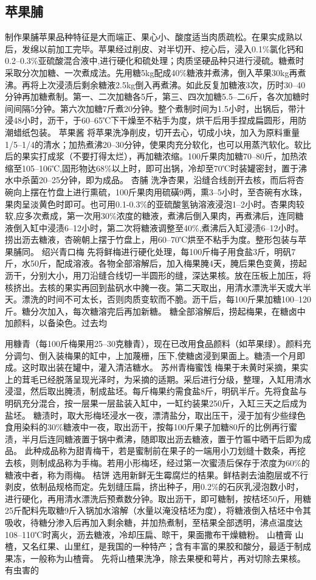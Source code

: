 \documentclass{ctexbook}
\begin{document}
\subsection{苹果脯}
制作果脯苹果品种特征是大而端正、果心小、酸度适当肉质疏松。在果实成熟以后，发绵以前加工完毕。苹果经过削皮、对半切开、挖心后，浸入0.1\%氯化钙和0.2--0.3\%亚硫酸混合液中,进行硬化和硫处理；肉质坚硬品种只进行浸硫。糖煮时采取分次加糖、一次煮成法。先用糖5kg配成40\%糖液并煮沸，倒入苹果30kg再煮沸。再将上次浸渍后剩余糖液2.5kg倒入再煮沸。如此反复加糖液3次，历时30--40分钟再加糖煮制。第一、二次加糖各5斤，第三、四次加糖5.5--二6斤，各次加糖时间间隔5分钟。第六次加糖7斤煮20分钟。整个煮制时间为1.5小时，出锅后，带汁浸48小时，沥干，于60--65℃下干燥至不粘手为度，烘干后用手捏成扁圆形，用防潮蜡纸包装。
苹果酱
将苹果洗净削皮，切开去心，切成小块，加入为原料重量1/5--1/4的清水；加热煮沸20--30分钟，使果肉充分软化，也可以用蒸汽软化。软比后的果实打成浆（不要打得太烂），再加糖浓缩。100斤果肉加糖70--80斤，加热浓缩至105--106℃,固形物达68\%以上时，即可出锅，冷却至70℃时装罐密封，置于沸水中杀菌20--25分钟，即为成品。
杏脯
洗净杏果，沿缝合线剖开去核，而后将杏碗向上摆在竹盘上进行熏硫，100斤果肉用硫磺9两，熏3--5小时，至杏碗有水珠，果肉呈淡黄色时即可。也可用0.1-0.3\%的亚硫酸氢钠溶液浸泡1--2小时。杏果肉较软,应多次煮成，第一次用30\%浓度的糖液，煮沸后倒入果肉，再煮沸后，连同糖液倒入缸中浸渍6--12小时，第二次将糖液调整至40\%,煮沸后入缸浸渍6--12小时。捞出沥去糖液，杏碗朝上摆于竹盘上，用60--70℃烘至不粘手为度。整形包装与苹果脯同。
绍兴青口梅
先将鲜梅进行硬化处理，每100斤梅子用食盐3斤，明矾7斤，水50斤，配成溶液。各物全部溶解后，加入梅果腌4天，腌后果色变黄，捞起沥干，分别大小，用刀沿缝合线切一半圆形的缝，深达果核。放在压板上加压，将核挤出。去核的果实再回到盐矾水中腌一夜。第二天取出，用清水漂洗半天或大半天。漂洗的时间不可太长，否则肉质变软而不脆。沥干后，每100斤果加糖100--120斤。糖分次加入，每次糖溶完后再加新糖。
糖全部溶解后，捞起梅果，在糖卤中加颜料，以备染色。过去均

用糠青（每100斤梅果用25--30克糠青），现在已改用食品颜料（如苹果绿）。颜料充分调匀、倒入装梅果的缸中，上加蔑栅，压下,使糖卤浸到果面上。糖渍一个月即成。这时取出装在罐中，灌入清洁糖水。
苏州青梅蜜饯
梅果于未黄时采摘，果实上的茸毛已经脱落呈现光泽时，为采摘的适期。采后进行分级，整理，入缸用清水浸湿，然后取出腌渍，制成盐坯。每斤梅果约需食盐8斤，明矾半斤。先将食盐与明矾充分混合，按一层果一层盐装入缸中，一缸约装果250斤，入缸三天之后成为盐坯。
糖渍时，取大形梅坯浸水一夜，漂清盐分，取出压干，浸于加有少些绿色食用染料的30\%糖液中一夜，取出沥干，按每100斤果子加糖80斤的比例再行蜜渍，半月后连同糖液置于锅中煮沸，随即取出沥去糖液，置于竹匾中晒干后即为成品。
此种成品称为甜青梅干，若是蜜制前在果子的一端用小刀划缝十数条，再挖去核，则制成品称为手梅。若用小形梅坯，经过第一次蜜渍后保存于浓度为60\%的糖液中者，称为雨梅。
桔饼
选用新鲜无生霉腐烂的桔果。鲜桔剥去油胞层或不行剥皮，依制品规格而定。先划缝压扁，挤出种子，用0.2\%的石灰乳浸泡数小时，进行硬化，再用清水漂洗后预煮数分钟。取出沥干，即可糖制，按桔坯50斤，用糖25斤配料先取糖9斤入锅加水溶解（水量以淹没桔坯为度），将糖液倒入桔坯中令其吸收，待糖分渗入后再加入剩余糖，并加热煮制，至桔果全部透明，沸点温度达108--110℃时离火，沥去糖液，冷却压扁、晾干，果面撒布干燥糖粉。
山楂膏
山楂，又名红果、山里红，是我国的一种特产；含有丰富的果胶和酸分，最适于制成果冻，一般称为山楂膏。
先将山楂果洗净，除去果梗和萼片，再对切除去果核。有虫害的
\end{document}
